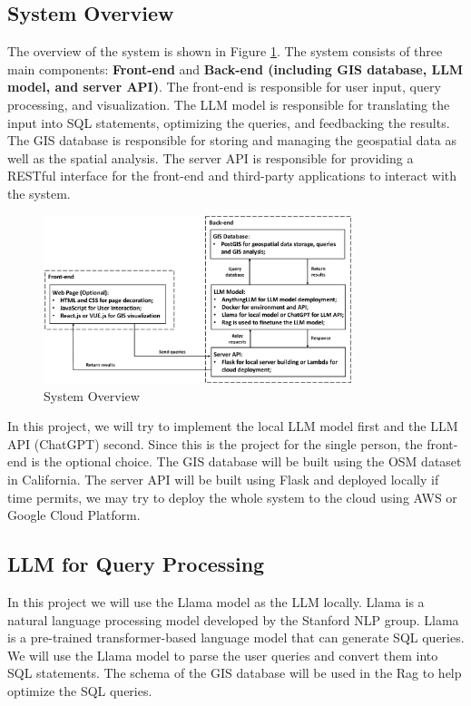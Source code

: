 \documentclass{article}
\begin{document}
\subsection{System Overview}

The overview of the system is shown in Figure \ref{fig:system_overview}. The system consists of three main components: \textbf{Front-end} and \textbf{Back-end (including GIS database, LLM model, and server API)}. The front-end is responsible for user input, query processing, and visualization. The LLM model is responsible for translating the input into SQL statements, optimizing the queries, and feedbacking the results. The GIS database is responsible for storing and managing the geospatial data as well as the spatial analysis. The server API is responsible for providing a RESTful interface for the front-end and third-party applications to interact with the system.

\begin{figure}[H]
    \centering
    \includegraphics[width=0.8\textwidth]{figs/Overview.pdf}
    \caption{System Overview}
    \label{fig:system_overview}
\end{figure}

In this project, we will try to implement the local LLM model first and the LLM API (ChatGPT) second. Since this is the project for the single person, the front-end is the optional choice.  The GIS database will be built using the OSM dataset in California. The server API will be built using Flask and deployed locally if time permits, we may try to deploy the whole system to the cloud using AWS or Google Cloud Platform.

\subsection{LLM for Query Processing}
In this project we will use the Llama model \cite{touvron2023llama} as the LLM locally. Llama is a natural language processing model developed by the Stanford NLP group. Llama is a pre-trained transformer-based language model that can generate SQL queries. We will use the Llama model to parse the user queries and convert them into SQL statements. The schema of the GIS database will be used in the Rag to help optimize the SQL queries.
\end{document}
